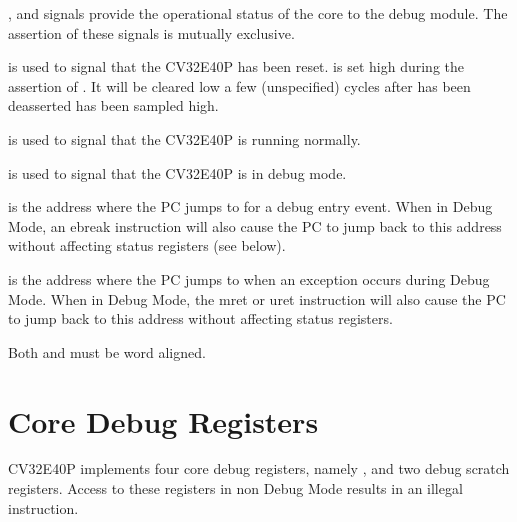 \documentclass[letterpaper,10pt,english]{sphinxmanual}
\begin{document}
\sphinxAtStartPar
{},  and  signals provide the operational status of the core to the debug module.
The assertion of these signals is mutually exclusive.

\sphinxAtStartPar
{} is used to signal that the CV32E40P has been reset.  is set high during the assertion of .
It will be cleared low a few (unspecified) cycles after  has been deasserted   has been sampled high.

\sphinxAtStartPar
{} is used to signal that the CV32E40P is running normally.

\sphinxAtStartPar
{} is used to signal that the CV32E40P is in debug mode.

\sphinxAtStartPar
{} is the address where the PC jumps to for a debug entry event. When in Debug Mode, an ebreak instruction will also cause the PC
to jump back to this address without affecting status registers (see {\hyperref[\detokenize{debug:ebreak-behavior}]{}} below).

\sphinxAtStartPar
{} is the address where the PC jumps to when an exception occurs during Debug Mode.
When in Debug Mode, the mret or uret instruction will also cause the PC to jump back to this address without affecting status registers.

\sphinxAtStartPar
Both  and  must be word aligned.


\section{Core Debug Registers}
\label{\detokenize{debug:core-debug-registers}}
\sphinxAtStartPar
CV32E40P implements four core debug registers, namely {\hyperref[\detokenize{control_status_registers:csr-dcsr}]{}}, {\hyperref[\detokenize{control_status_registers:csr-dpc}]{}} and two debug scratch registers.
Access to these registers in non Debug Mode results in an illegal instruction.
\end{document}
